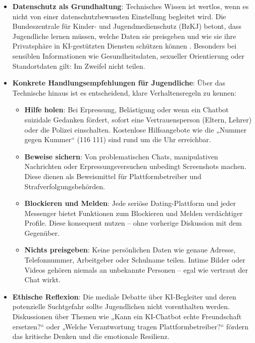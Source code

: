 \documentclass[12pt,a4paper,oneside]{scrartcl}
\begin{document}
	\begin{itemize}
		\item \textbf{Datenschutz als Grundhaltung}: Technisches Wissen ist wertlos, wenn es nicht von einer datenschutzbewussten Einstellung begleitet wird. Die Bundeszentrale für Kinder- und Jugendmedienschutz (BzKJ) betont, dass Jugendliche lernen müssen, welche Daten sie preisgeben und wie sie ihre Privatsphäre in KI-gestützten Diensten schützen können \cite{BzkJ2026}. Besonders bei sensiblen Informationen wie Gesundheitsdaten, sexueller Orientierung oder Standortdaten gilt: Im Zweifel nicht teilen.
		
		\item \textbf{Konkrete Handlungsempfehlungen für Jugendliche}: Über das Technische hinaus ist es entscheidend, klare Verhaltensregeln zu kennen:
		\begin{itemize}
			\item \textbf{Hilfe holen}: Bei Erpressung, Belästigung oder wenn ein Chatbot suizidale Gedanken fördert, sofort eine Vertrauensperson (Eltern, Lehrer) oder die Polizei einschalten. Kostenlose Hilfsangebote wie die „Nummer gegen Kummer“ (116 111) sind rund um die Uhr erreichbar.
			\item \textbf{Beweise sichern}: Von problematischen Chats, manipulativen Nachrichten oder Erpressungsversuchen unbedingt Screenshots machen. Diese dienen als Beweismittel für Plattformbetreiber und Strafverfolgungsbehörden.
			\item \textbf{Blockieren und Melden}: Jede seriöse Dating-Plattform und jeder Messenger bietet Funktionen zum Blockieren und Melden verdächtiger Profile. Diese konsequent nutzen – ohne vorherige Diskussion mit dem Gegenüber.
			\item \textbf{Nichts preisgeben}: Keine persönlichen Daten wie genaue Adresse, Telefonnummer, Arbeitgeber oder Schulname teilen. Intime Bilder oder Videos gehören niemals an unbekannte Personen – egal wie vertraut der Chat wirkt.
		\end{itemize}
		
		\item \textbf{Ethische Reflexion}: Die mediale Debatte über KI-Begleiter und deren potenzielle Suchtgefahr sollte Jugendlichen nicht vorenthalten werden. Diskussionen über Themen wie „Kann ein KI-Chatbot echte Freundschaft ersetzen?“ oder „Welche Verantwortung tragen Plattformbetreiber?“ fördern das kritische Denken und die emotionale Resilienz.
	\end{itemize}
	
\end{document}
